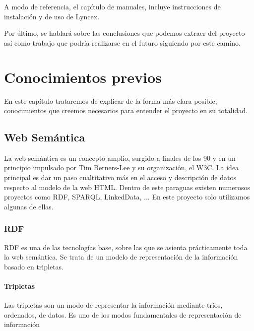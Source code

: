\documentclass[12pt]{report} %
\begin{document}
A modo de referencia, el capítulo de manuales, incluye instrucciones de instalación y de uso de Lyncex.

Por último, se hablará sobre las conclusiones que podemos extraer del proyecto así como trabajo que podría realizarse en el futuro siguiendo por este camino.


\chapter{Conocimientos previos}

En este capítulo trataremos de explicar de la forma más clara posible, conocimientos que creemos necesarios para entender el proyecto en su totalidad.

\section{Web Semántica}

La web semántica es un concepto amplio, surgido a finales de los 90 y en un principio impulsado por Tim Berners-Lee y su organización, el W3C. La idea principal es dar un paso cualtitativo más en el acceso y descripción de datos respecto al modelo de la web HTML. Dentro de este paraguas existen numerosos proyectos como RDF, SPARQL, LinkedData, ... En este proyecto solo utilizamos algunas de ellas.

\subsection{RDF}

RDF es una de las tecnologías base, sobre las que se asienta prácticamente toda la web semántica. Se trata de un modelo de representación de la información basado en tripletas.

\subsubsection{Tripletas}
Las tripletas son un modo de representar la información mediante tríos, ordenados, de datos.
Es uno de los modos fundamentales de representación de información
\end{document}
